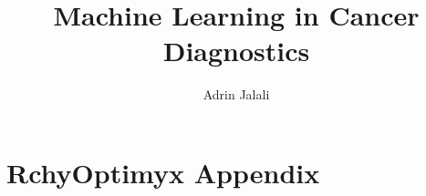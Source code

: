 \documentclass{thesis}
\title{Machine Learning in Cancer Diagnostics}
\author{Adrin Jalali}
\begin{document}
\frontmatter

\maketitle
\tableofcontents



\mainmatter










\appendix
\chapter{RchyOptimyx Appendix}



\listoftables
\listoffigures



\end{document}
